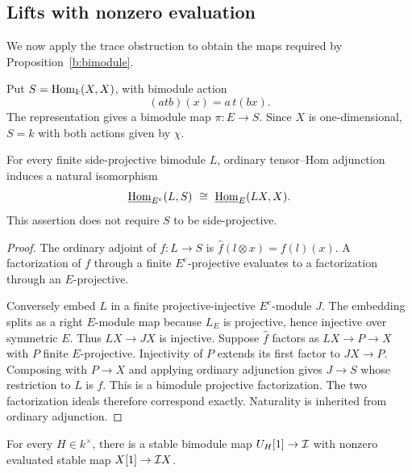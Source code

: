 \subsection{Lifts with nonzero evaluation}

We now apply the trace obstruction to obtain the maps required by
Proposition~\ref{b:bimodule}.

Put \(S=\operatorname{Hom}_k(X,X)\), with bimodule action
\[
 (atb)(x)=a\,t(bx).
\]
The representation gives a bimodule map \(\pi:E\to S\).
Since \(X\) is one-dimensional, \(S=k\) with both actions given
by \(\chi\).

\begin{lemma}\label{b:stable-adjunction}
For every finite side-projective bimodule \(L\), ordinary
tensor--Hom adjunction induces a natural isomorphism
\[
 \underline{\operatorname{Hom}}_{E^e}(L,S)\ \cong\ \underline{\operatorname{Hom}}_E(LX,X).
\]
This assertion does not require \(S\) to be side-projective.
\end{lemma}

\begin{proof}
The ordinary adjoint of \(f:L\to S\) is
\(\widehat f(l\otimes x)=f(l)(x)\).
A factorization of \(f\) through a finite \(E^e\)-projective
evaluates to a factorization through an \(E\)-projective.

Conversely embed \(L\) in a finite projective-injective
\(E^e\)-module \(J\).
The embedding splits as a right \(E\)-module map because
\(L_E\) is projective, hence injective over symmetric \(E\).
Thus \(LX\to JX\) is injective.
Suppose \(\widehat f\) factors as \(LX\to P\to X\) with \(P\)
finite \(E\)-projective.  Injectivity of \(P\) extends its first
factor to \(JX\to P\).  Composing with \(P\to X\) and applying
ordinary adjunction gives \(J\to S\) whose restriction to \(L\)
is \(f\).  This is a bimodule projective factorization.
The two factorization ideals therefore correspond exactly.
Naturality is inherited from ordinary adjunction.
\end{proof}

\begin{lemma}\label{b:evaluated-lift}
For every \(H\in k^\times\), there is a stable bimodule map
\(U_H[1]\to\mathcal I\) with nonzero evaluated stable map
\(X[1]\to\mathcal I X\).
\end{lemma}

